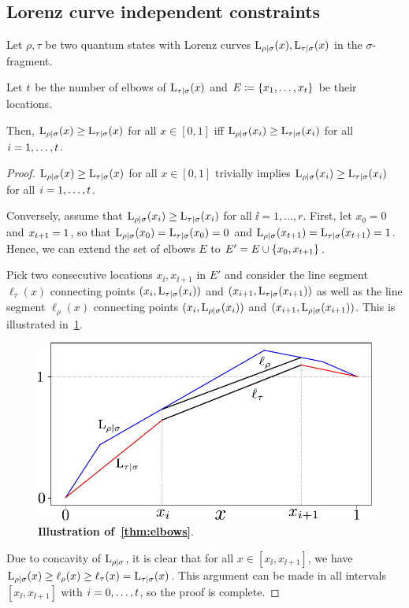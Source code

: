 \subsection{Lorenz curve independent constraints}\label{app:lc_constraints}

\begin{theorem}
	Let $\rho, \tau$ be two quantum states with Lorenz curves $\lc{\rho}{\sigma}(x), \lc{\tau}{\sigma}(x)$ in the $\sigma$-fragment.
	
	Let $\tt$ be the number of elbows of $\lc{\tau}{\sigma}(x)$ and $E \coloneqq \{x_1, \dots, x_\tt\}$ be their locations.
	
	Then, $\lc{\rho}{\sigma}(x) \geq \lc{\tau}{\sigma}(x)$ for all $x \in [0,1]$ iff $\lc{\rho}{\sigma}(x_{\ii}) \geq \lc{\tau}{\sigma}(x_{\ii})$ for all $\ii =1,\dots,\tt$.
\end{theorem}
\begin{proof}	
	$\lc{\rho}{\sigma}(x) \geq \lc{\tau}{\sigma}(x)$ for all $x \in [0,1]$ trivially implies $\lc{\rho}{\sigma}(x_{\ii}) \geq \lc{\tau}{\sigma}(x_{\ii})$ for all $\ii = 1,\dots,\tt$.
	
	Conversely, assume that $\lc{\rho}{\sigma}(x_{\ii}) \geq \lc{\tau}{\sigma}(x_{\ii})$ for all $\ii = 1,\dots,r$.
	First, let $x_0 = 0$ and $x_{\tt+1} = 1$, so that $\lc{\rho}{\sigma}(x_0) = \lc{\tau}{\sigma}(x_0) = 0$ and $\lc{\rho}{\sigma}(x_{\tt+1}) = \lc{\tau}{\sigma}(x_{\tt+1}) = 1$.
	Hence, we can extend the set of elbows $E$ to $E' = E \cup \{x_0, x_{\tt+1}\}$.
	
	Pick two consecutive locations $x_{\ii}, x_{\ii+1}$ in $E'$ and consider the line segment $\ell_\tau(x)$ connecting points $(x_{\ii}, \lc{\tau}{\sigma}(x_{\ii}))$ and $(x_{\ii+1}, \lc{\tau}{\sigma}(x_{\ii+1}))$ as well as the line segment $\ell_\rho(x)$ connecting points $(x_{\ii}, \lc{\rho}{\sigma}(x_{\ii}))$ and $(x_{\ii+1}, \lc{\rho}{\sigma}(x_{\ii+1}))$.
	This is illustrated in~\cref{fig:elbows_proof}.
\begin{figure}[h]
    \centering
    \includegraphics[scale=0.6]{figs/elbows_proof.pdf}
    \caption{\textbf{Illustration of~\cref{thm:elbows}}.
    }
    \label{fig:elbows_proof}
\end{figure}

	Due to concavity of $\lc{\rho}{\sigma}$, it is clear that for all $x \in [x_{\ii}, x_{\ii+1}]$, we have $\lc{\rho}{\sigma}(x) \geq \ell_\rho(x) \geq \ell_\tau(x) = \lc{\tau}{\sigma}(x)$.
	This argument can be made in all intervals $[x_{\ii}, x_{\ii+1}]$ with $\ii=0,\dots,\tt$, so the proof is complete.
\end{proof}
